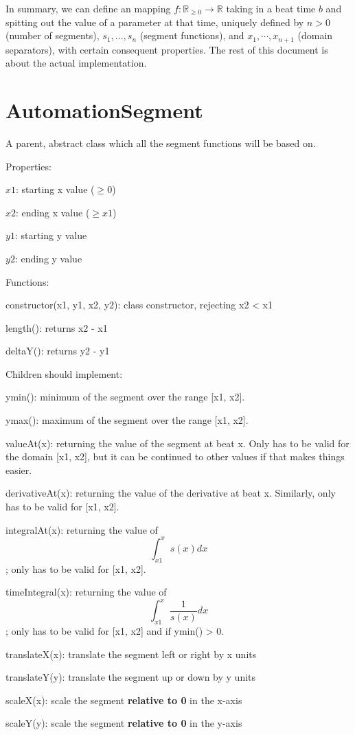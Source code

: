 \documentclass{article}
\begin{document}
In summary, we can define an mapping $f:\mathbb{R}_{\geq 0}\to \mathbb{R}$ taking in a beat time $b$ and spitting out the value of a parameter at that time, uniquely defined by $n>0$ (number of segments), $s_1, ..., s_n$ (segment functions), and $x_1, \cdots, x_{n+1}$ (domain separators), with certain consequent properties. The rest of this document is about the actual implementation.

\section{AutomationSegment}

A parent, abstract class which all the segment functions will be based on.

Properties:

$x1$: starting x value ($\geq 0$)

$x2$: ending x value ($\geq x1$)

$y1$: starting y value

$y2$: ending y value

Functions:

constructor(x1, y1, x2, y2): class constructor, rejecting x2 < x1

length(): returns x2 - x1

deltaY(): returns y2 - y1

Children should implement:

ymin(): minimum of the segment over the range [x1, x2].

ymax(): maximum of the segment over the range [x1, x2].

valueAt(x): returning the value of the segment at beat x. Only has to be valid for the domain [x1, x2], but it can be continued to other values if that makes things easier.

derivativeAt(x): returning the value of the derivative at beat x. Similarly, only has to be valid for [x1, x2].

integralAt(x): returning the value of $$\int_{x1}^x s(x) dx$$; only has to be valid for [x1, x2].

timeIntegral(x): returning the value of $$\int_{x1}^x \frac{1}{s(x)} dx$$; only has to be valid for [x1, x2] and if ymin() > 0.

translateX(x): translate the segment left or right by x units

translateY(y): translate the segment up or down by y units

scaleX(x): scale the segment \textbf{relative to 0} in the x-axis

scaleY(y): scale the segment \textbf{relative to 0} in the y-axis

\end{document}
